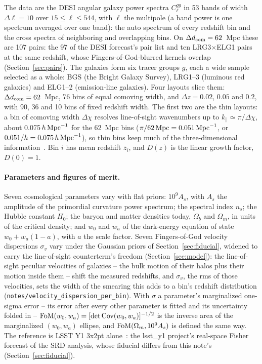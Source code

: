 \documentclass[11pt]{article}
\newcommand{\hMpc}{\,h\,{\rm Mpc}^{-1}}
\newcommand{\NbinsCom}{76}
\newcommand{\NbinsTwo}{90}
\newcommand{\NbinsFive}{36}
\newcommand{\NbinsTwenty}{10}
\newcommand{\Nbands}{53}
\newcommand{\KparCom}{0.075}
\newcommand{\NcrossCom}{107}
\newcommand{\NcrossDESI}{97}
\newcommand{\NcrossExtra}{ten}
\begin{document}
The data are the DESI angular galaxy power spectra $C_\ell^{gg}$ in
\Nbands{} bands of width $\Delta\ell = 10$ over $15 \le \ell \le 544$,
with $\ell$ the multipole (a band power is one spectrum averaged over
one band): the auto spectrum of every redshift bin and
the cross spectra of neighboring and overlapping bins.  On
$\Delta d_{\rm com} = 62$~Mpc these are \NcrossCom{} pairs: the
\NcrossDESI{} of the DESI forecast's pair list and \NcrossExtra{} LRG3$\times$ELG1
pairs at the same redshift, whose Fingers-of-God-blurred kernels
overlap (Section~\ref{sec:pairs}).  The galaxies
form six tracer groups $g$, each a wide sample selected as a whole: BGS
(the Bright Galaxy Survey), \mbox{LRG1--3} (luminous red galaxies) and
\mbox{ELG1--2} (emission-line galaxies).  Four layouts slice them:
$\Delta d_{\rm com} = 62$~Mpc, \NbinsCom{} bins of equal comoving width,
and $\Delta z = 0.02$, $0.05$ and $0.2$, with \NbinsTwo{}, \NbinsFive{}
and \NbinsTwenty{} bins of fixed redshift width.  The first two are the
thin layouts: a bin of comoving width $\Delta\chi$ resolves
line-of-sight wavenumbers up to $k_\parallel \simeq \pi/\Delta\chi$,
about \KparCom{}$\hMpc$ for the 62~Mpc bins
($\pi/62\,{\rm Mpc} = 0.051\,{\rm Mpc}^{-1}$, or
$0.051/h = 0.075\hMpc$), so thin bins keep much of
the three-dimensional information~\cite{Asorey2012}.  Bin $i$ has mean
redshift $\bar{z}_i$, and $D(z)$ is the linear growth factor,
$D(0) = 1$.

\paragraph{Parameters and figures of merit.}
Seven cosmological parameters vary with flat priors: $10^9 A_s$, with
$A_s$ the amplitude of the primordial curvature power spectrum; the
spectral index $n_s$; the Hubble constant $H_0$; the baryon and matter
densities today, $\Omega_b$ and $\Omega_m$, in units of the critical
density; and $w_0$ and $w_a$ of the dark-energy equation of state
$w_0 + w_a(1 - a)$, with $a$ the scale factor.  Seven Fingers-of-God
velocity dispersions $\sigma_v$ vary under the Gaussian priors of
Section~\ref{sec:fiducial}, widened to carry the line-of-sight
counterterm's freedom (Section~\ref{sec:model}): the line-of-sight
peculiar velocities of galaxies -- the bulk motion of their halos plus
their motion inside them -- shift the measured redshifts, and
$\sigma_v$, the rms of those velocities, sets the width of the
smearing this adds to a bin's redshift distribution
(\texttt{notes/velocity\_dispersion\_per\_bin}).  With $\sigma$ a parameter's
marginalized one-sigma error -- its error after every other parameter
is fitted and its uncertainty folded in -- ${\rm FoM}(w_0, w_a) = [\det {\rm
Cov}(w_0, w_a)]^{-1/2}$ is the inverse area of the marginalized
$(w_0, w_a)$ ellipse, and ${\rm FoM}(\Omega_m, 10^9 A_s)$ is defined the
same way.  The reference is LSST Y1 3x2pt alone~\cite{DESCSRD2018}: the
lsst\_y1 project's real-space Fisher forecast of the SRD analysis,
whose fiducial differs from this note's (Section~\ref{sec:fiducial}).
\end{document}
